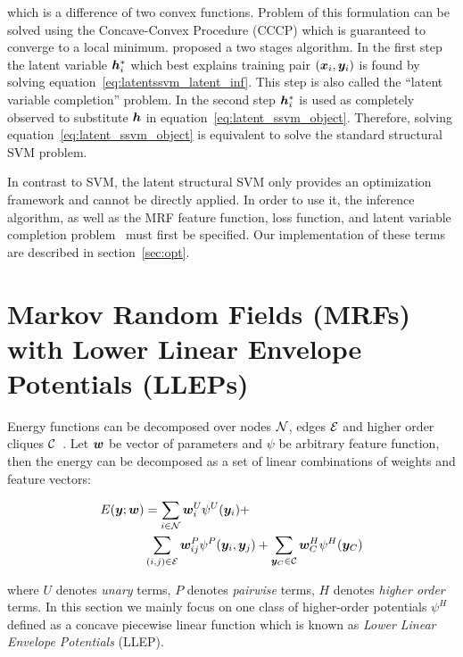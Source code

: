 \noindent which is a difference of two convex functions. Problem
of this formulation can be solved using the Concave-Convex
Procedure (CCCP)\cite{yuille2002concave} which is guaranteed to
converge to a local minimum.  proposed a
two stages algorithm. In the first step the latent variable
${\bm{h}}_i^*$ which best explains training pair $({\bm{x}}_i, {\bm{y}}_i)$ is
found by solving equation~\eqref{eq:latentssvm_latent_inf}. This
step is also called the ``latent variable completion'' problem.
In the second step ${\bm{h}}_i^*$ is used as completely observed to
substitute ${\bm{h}}$ in equation~\eqref{eq:latent_ssvm_object}.
Therefore, solving equation~\eqref{eq:latent_ssvm_object} is
equivalent to solve the standard structural SVM problem.

In contrast to SVM, the latent structural SVM only provides an
optimization framework and cannot be directly applied. In order
to use it, the inference algorithm, as well as the MRF feature
function, loss function, and latent variable completion
problem~\cite{yu2009learning} must first be specified. Our
implementation of these terms are described in
section~\ref{sec:opt}.

\section[MRFs with LLEPs]{Markov Random Fields (MRFs) with Lower
  Linear Envelope Potentials (LLEPs)}
\label{sec:inference}

Energy functions can be decomposed over nodes ${\mathcal{N}}$, edges ${\mathcal{E}}$
and higher order cliques $\cal C$~\cite{Szummer:ECCV08}. Let
${\bm{w}}$ be vector of parameters and $\psi$ be arbitrary feature
function, then the energy can be decomposed as a set of linear
combinations of weights and feature vectors:

\begin{align}
  \label{eq:energyfunction_UPH}
  E({\bm{y}};{\bm{w}})&=\sum_{i\in {\mathcal{N}}}{{\bm{w}}_i^U\psi^U({\bm{y}}_i)}+ \notag\\
  & \sum_{(i,j)\in {\mathcal{E}}}{{\bm{w}}_{ij}^P\psi^P({\bm{y}}_i,{\bm{y}}_j)}+
  \sum_{{\bm{y}}_C\in \cal C}{{\bm{w}}_C^H\psi^H({\bm{y}}_C)}
\end{align}

\noindent where $U$ denotes \emph{unary} terms, $P$ denotes
\emph{pairwise} terms, $H$ denotes \emph{higher order} terms. In
this section we mainly focus on one class of higher-order
potentials $\psi^H$ defined as a concave piecewise linear
function which is known as \emph{Lower Linear Envelope
  Potentials} (LLEP). 

